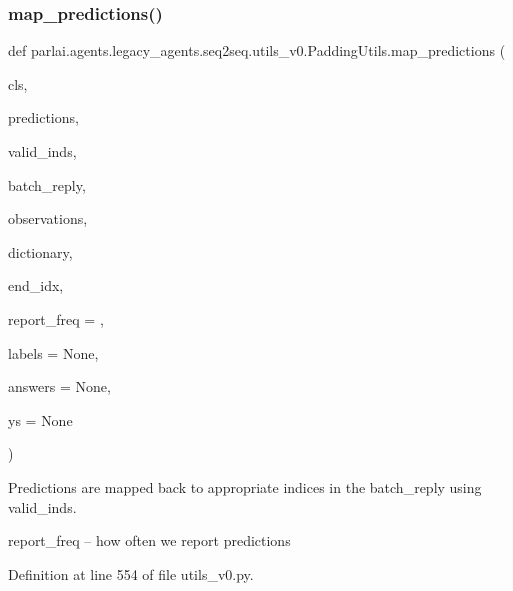 \subsubsection{\texorpdfstring{map\+\_\+predictions()}{map\_predictions()}}
{\footnotesize\ttfamily def parlai.\+agents.\+legacy\+\_\+agents.\+seq2seq.\+utils\+\_\+v0.\+Padding\+Utils.\+map\+\_\+predictions (\begin{DoxyParamCaption}\item[{}]{cls,  }\item[{}]{predictions,  }\item[{}]{valid\+\_\+inds,  }\item[{}]{batch\+\_\+reply,  }\item[{}]{observations,  }\item[{}]{dictionary,  }\item[{}]{end\+\_\+idx,  }\item[{}]{report\+\_\+freq = {},  }\item[{}]{labels = {\ttfamily None},  }\item[{}]{answers = {\ttfamily None},  }\item[{}]{ys = {\ttfamily None} }\end{DoxyParamCaption})}

\begin{DoxyVerb}Predictions are mapped back to appropriate indices in the batch_reply using
valid_inds.

report_freq -- how often we report predictions
\end{DoxyVerb}
 

Definition at line 554 of file utils\+\_\+v0.\+py.


